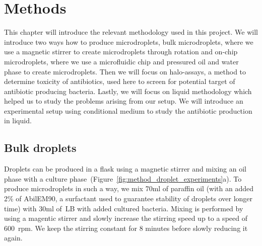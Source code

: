\chapter{Methods}

This chapter will introduce the relevant methodology used in this project. We will introduce two ways how to produce microdroplets, bulk microdroplets, where we use a magnetic stirrer to create microdroplets through rotation and on-chip microdroplets, where we use a microfluidic chip and pressured oil and water phase to create microdroplets. Then we will focus on halo-assays, a method to determine toxicity of antibiotics, used here to screen for potential target of antibiotic producing bacteria. Lastly, we will focus on liquid methodology which helped us to study the problems arising from our setup. We will introduce an experimental setup using conditional medium to study the antibiotic production in liquid.

\section{Bulk droplets}
Droplets can be produced in a flask using a magnetic stirrer and mixing an oil phase with a culture phase~(Figure~\ref{fig:method_droplet_experiments}a). To produce microdroplets in such a way, we mix 70ml of paraffin oil (with an added 2\% of AbilEM90, a surfactant used to guarantee stability of droplets over longer time) with 30ml of~\gls{LB} with added cultured bacteria. Mixing is performed by using a magentic stirrer and slowly increase the stirring speed up to a speed of 600~\gls{rpm}. We keep the stirring constant for 8 minutes before slowly reducing it again. 

